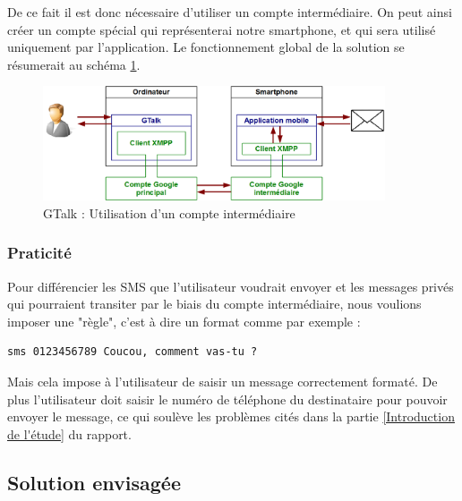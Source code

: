 De ce fait il est donc nécessaire d'utiliser un compte intermédiaire.
On peut ainsi créer un compte spécial qui représenterai notre smartphone, et qui sera utilisé uniquement par l'application.
Le fonctionnement global de la solution se résumerait au schéma \ref{schemaFonctionnement_GTalk}.

\begin{figure}[!h]
	\center
	\includegraphics[width=0.9\textwidth]{img/schemaFonctionnement_GTalk.png}
	\caption{GTalk : Utilisation d'un compte intermédiaire}
	\label{schemaFonctionnement_GTalk}
\end{figure}


\subsubsection{Praticité}

Pour différencier les SMS que l'utilisateur voudrait envoyer et les messages privés qui pourraient transiter par le biais du compte intermédiaire, nous voulions imposer une "règle", c'est à dire un format comme par exemple :
\begin{lstlisting}
sms 0123456789 Coucou, comment vas-tu ?
\end{lstlisting}

Mais cela impose à l'utilisateur de saisir un message correctement formaté.
De plus l'utilisateur doit saisir le numéro de téléphone du destinataire pour pouvoir envoyer le message, ce qui soulève les problèmes cités dans la partie \ref{Introduction de l'étude} du rapport.




\subsection{Solution envisagée}

